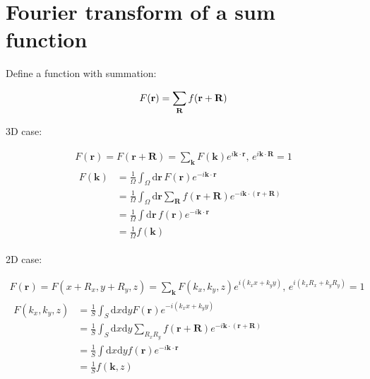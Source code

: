 \section{Fourier transform of a sum function}

Define a function with summation:

\begin{equation}\label{sum-function-definition}
    F(\mathbf{r}) = \sum_{\mathbf{R}} f(\mathbf{r}+\mathbf{R}) \\
\end{equation}

\noindent
3D case:

\begin{equation}\label{sum-function-fourier-3D}
    \begin{gathered}
        F(\mathbf{r}) = F(\mathbf{r}+\mathbf{R}) 
            = \sum_{\mathbf{k}} F(\mathbf{k}) e^{i\mathbf{k}\cdot\mathbf{r}} , \, 
            e^{i\mathbf{k}\cdot\mathbf{R}} = 1 \\
        \begin{aligned}
            F(\mathbf{k}) 
            &= \frac{1}{\Omega} \int_{\Omega} \mathrm{d}\mathbf{r} \, F(\mathbf{r}) e^{-i\mathbf{k}\cdot\mathbf{r}} \\
            &= \frac{1}{\Omega} \int_{\Omega} \mathrm{d}\mathbf{r} \sum_{\mathbf{R}} f(\mathbf{r}+\mathbf{R}) e^{-i\mathbf{k}\cdot(\mathbf{r}+\mathbf{R})} \\
            &= \frac{1}{\Omega} \int \mathrm{d}\mathbf{r} \, f(\mathbf{r}) e^{-i\mathbf{k}\cdot\mathbf{r}} \\
            &= \frac{1}{\Omega} f(\mathbf{k})
        \end{aligned}
    \end{gathered}
\end{equation}

\noindent
2D case:

\begin{equation}\label{sum-function-fourier-2D}
    \begin{gathered}
        F(\mathbf{r}) = F(x+R_x,y+R_y,z) 
        = \sum_{\mathbf{k}} F(k_x, k_y, z) e^{i(k_x x + k_y y)} , \, 
            e^{i(k_xR_x + k_yR_y)} = 1 \\
        \begin{aligned}
            F(k_x, k_y, z) 
            &= \frac{1}{S} \int_{S} \mathrm{d}x \mathrm{d}y F(\mathbf{r}) e^{-i(k_x x + k_y y)} \\
            &= \frac{1}{S} \int_{S} \mathrm{d}x \mathrm{d}y \sum_{R_xR_y} f(\mathbf{r}+\mathbf{R}) e^{-i\mathbf{k}\cdot(\mathbf{r}+\mathbf{R})} \\
            &= \frac{1}{S} \int \mathrm{d}x \mathrm{d}y f(\mathbf{r}) e^{-i\mathbf{k}\cdot\mathbf{r}} \\
            &= \frac{1}{S} f(\mathbf{k}, z) 
        \end{aligned}
    \end{gathered}
\end{equation}


